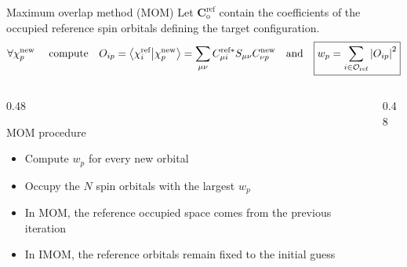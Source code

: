 \documentclass[aspectratio=169,9pt]{beamer}
\newcommand{\bC}{\boldsymbol{C}}
\begin{document}

\begin{frame}{Maximum overlap method (MOM)}
	Let $\bC_{\text{o}}^\text{ref}$ contain the coefficients of the occupied reference spin orbitals defining
	the target configuration.
	\begin{equation*}
		\qq*{$\forall \chi_p^\text{new}$ \quad compute}
		O_{ip}
		=
		\braket{\chi_i^\text{ref}}{\chi_p^\text{new}}
		=
		\sum_{\mu\nu}
		C_{\mu i}^{\text{ref}*}
		S_{\mu\nu}
		C_{\nu p}^\text{new}
		\qand
		\boxed{
			w_p
			=
			\sum_{i\in\mathcal{O}_{\text{ref}}}
			\abs{O_{ip}}^2
		}
	\end{equation*}

	\begin{columns}[T,onlytextwidth]
		\begin{column}{0.48\textwidth}
			\begin{block}{MOM procedure}
				\begin{itemize}
					\item Compute $w_p$ for every new orbital
					\item Occupy the $N$ spin orbitals
					      with the \alert{largest $w_p$}
					\item In MOM, the reference occupied space
					      comes from the previous iteration
					\item In \alert{IMOM}, the reference orbitals
					      remain fixed to the initial guess
				\end{itemize}
			\end{block}
		\end{column}

		\begin{column}{0.48\textwidth}
			\center
\end{column}
\end{columns}
\end{frame}
\end{document}
